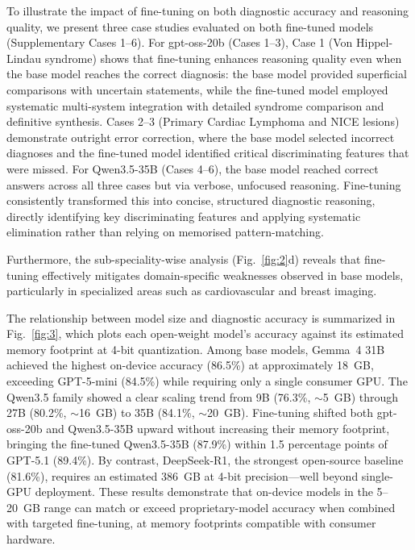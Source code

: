\documentclass[10pt,journal,compsoc, onecolumn]{IEEEtran}
\begin{document}
To illustrate the impact of fine-tuning on both diagnostic accuracy and reasoning quality, we 
present three case studies evaluated on both fine-tuned models (Supplementary Cases 1--6). 
For gpt-oss-20b (Cases 1--3), Case 1 (Von Hippel-Lindau syndrome) shows that fine-tuning 
enhances reasoning quality even when the base model reaches the correct diagnosis: the base 
model provided superficial comparisons with uncertain statements, while the fine-tuned model 
employed systematic multi-system integration with detailed syndrome comparison and definitive 
synthesis. Cases 2--3 (Primary Cardiac Lymphoma and NICE lesions) demonstrate outright error 
correction, where the base model selected incorrect diagnoses and the fine-tuned model 
identified critical discriminating features that were missed. For Qwen3.5-35B (Cases 4--6), 
the base model reached correct answers across all three cases but via verbose, unfocused 
reasoning. Fine-tuning consistently transformed this into concise, structured diagnostic 
reasoning, directly identifying key discriminating features and applying systematic elimination 
rather than relying on memorised pattern-matching.

Furthermore, the sub-speciality-wise analysis (Fig.~\ref{fig:2}d) reveals that fine-tuning effectively mitigates domain-specific weaknesses observed in base models, particularly in specialized areas such as cardiovascular and breast imaging.

The relationship between model size and diagnostic accuracy is summarized in Fig.~\ref{fig:3}, which plots each open-weight model's accuracy against its estimated memory footprint at 4-bit quantization. Among base models, Gemma~4 31B achieved the highest on-device accuracy (86.5\%) at approximately 18~GB, exceeding GPT-5-mini (84.5\%) while requiring only a single consumer GPU. The Qwen3.5 family showed a clear scaling trend from 9B (76.3\%, ${\sim}$5~GB) through 27B (80.2\%, ${\sim}$16~GB) to 35B (84.1\%, ${\sim}$20~GB). Fine-tuning shifted both gpt-oss-20b and Qwen3.5-35B upward without increasing their memory footprint, bringing the fine-tuned Qwen3.5-35B (87.9\%) within 1.5 percentage points of GPT-5.1 (89.4\%). By contrast, DeepSeek-R1, the strongest open-source baseline (81.6\%), requires an estimated 386~GB at 4-bit precision---well beyond single-GPU deployment. These results demonstrate that on-device models in the 5--20~GB range can match or exceed proprietary-model accuracy when combined with targeted fine-tuning, at memory footprints compatible with consumer hardware.
\end{document}
